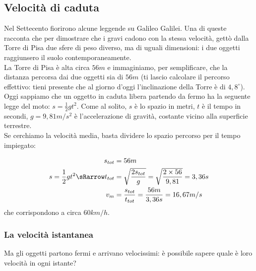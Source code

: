 \subsection{Velocità di caduta}
\label{subsec:differenziazione_velcaduta}
Nel Settecento fiorirono alcune leggende su Galileo Galilei. Una di queste 
racconta che per dimostrare che i gravi cadono con la stessa velocità, 
gettò dalla Torre di Pisa due sfere di peso diverso, ma di uguali 
dimensioni: i due oggetti raggiunsero il suolo 
contemporaneamente.\\
La Torre di Pisa è alta circa $56m$ e immaginiamo, per semplificare, che la 
distanza percorsa dai due oggetti sia di $56m$ (ti lascio calcolare il 
percorso effettivo: tieni presente che al giorno d'oggi l'inclinazione della 
Torre è di $4,8^\circ$).\\
Oggi sappiamo che un oggetto in caduta libera partendo da fermo ha la seguente
legge del moto:
\(s=\frac{1}{2}gt^2\). Come al solito, $s$ è lo spazio in metri, $t$ è il 
tempo in secondi, $g=9,81 m/s^2$ è l'accelerazione di gravità, costante vicino
alla superficie terrestre.\\
Se cerchiamo la velocità media, basta dividere lo spazio percorso per il 
tempo impiegato:

\begin{align*}
 s_{tot} &= 56m\\
 s=\frac{1}{2}gt^2 \sRarrow t_{tot} &= \sqrt{\frac{2s_{tot}}{g}}=
 \sqrt{\frac{2\times 56}{9,81}}=3,36 s\\
 v_m &= \frac{s_{tot}}{t_{tot}}=\frac{56 m}{3,36 s}=16,67 m/s
\end{align*}
che corrispondono a circa \(60 km/h\).

\subsubsection{La velocità istantanea}

Ma gli oggetti partono fermi e arrivano velocissimi: 
è possibile sapere quale è loro velocità in ogni istante?


